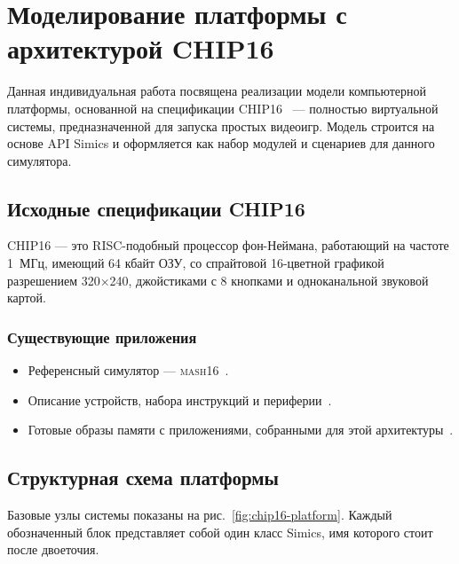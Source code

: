 \chapter{Моделирование платформы с архитектурой CHIP16}\label{chap:lab05}

Данная индивидуальная работа посвящена реализации модели компьютерной платформы, основанной на спецификации CHIP16~\cite{chip16-ngemu} --- полностью виртуальной системы, предназначенной для запуска простых видеоигр. Модель строится на основе API Simics и оформляется как набор модулей и сценариев для данного симулятора.

\section{Исходные спецификации CHIP16}

CHIP16 --- это RISC-подобный процессор фон-Неймана, работающий на частоте 1~МГц, имеющий 64 кбайт ОЗУ, со спрайтовой 16-цветной графикой разрешением 320×240, джойстиками с 8 кнопками и одноканальной звуковой картой.

\subsection{Существующие приложения}

\begin{itemize}
    \item Референсный симулятор --- \textsc{mash16}~\cite{chip16-mach16}.
    \item Описание устройств, набора инструкций и периферии~\cite{chip16-machspec}.
    \item Готовые образы памяти с приложениями, собранными для этой архитектуры~\cite{chip16-roms}.
\end{itemize}

\section{Структурная схема платформы}

Базовые узлы системы показаны на рис.~\ref{fig:chip16-platform}. Каждый обозначенный блок представляет собой один класс Simics, имя которого стоит после двоеточия.

